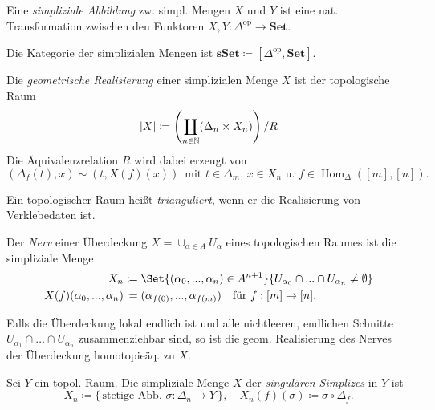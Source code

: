 \documentclass{cheat-sheet}
\newcommand{\SetC}{\mathbf{Set}} %
\newcommand{\sSet}{\mathbf{sSet}} %
\newcommand{\op}{\mathrm{op}} %
\DeclareMathOperator{\Hom}{Hom} %
\begin{document}
\begin{defn}
  Eine \emph{simpliziale Abbildung} zw. simpl. Mengen $X$ und $Y$ ist eine nat. Transformation zwischen den Funktoren $X, Y : \Delta^\op \to \SetC$.
\end{defn}

\begin{defn}
  Die Kategorie der simplizialen Mengen ist $\sSet \coloneqq [\Delta^\op, \SetC]$.
\end{defn}

\begin{defn}
  Die \emph{geometrische Realisierung} einer simplizialen Menge $X$ ist der topologische Raum
  \[ \lvert X\rvert \coloneqq \left( \coprod_{n \in \mathbb{N}} (\Delta_n \times X_{n}) \right) / R \]
  Die Äquivalenzrelation $R$ wird dabei erzeugt von
  \[
    (\Delta_f(t), x) \sim (t, X(f)(x)) \enspace
    \text{mit $t \in \Delta_m$, $x \in X_n$ u. $f \in \Hom_\Delta([m], [n])$.}
  \]
\end{defn}

\begin{defn}
  Ein topologischer Raum heißt \emph{trianguliert}, wenn er die Realisierung von Verklebedaten ist.
\end{defn}

\begin{defn}
  Der \emph{Nerv} einer Überdeckung $X = \cup_{\alpha \in A} U_\alpha$ eines topologischen Raumes ist die simpliziale Menge
  \begin{align*}
    X_n & \coloneqq \Set{(\alpha_0, \nldots, \alpha_n) \in A^{n+1}}{ U_{\alpha_0} \cap \nldots \cap U_{\alpha_n} \not= \emptyset } \\
    X(f)(\alpha_0, \nldots, \alpha_n) & \coloneqq (\alpha_{f(0)}, \nldots, \alpha_{f(m)}) \quad \text{für } f : [m] \to [n].
  \end{align*}
\end{defn}

\begin{bem}
  Falls die Überdeckung lokal endlich ist und alle nichtleeren, endlichen Schnitte $U_{\alpha_1} \cap \ldots \cap U_{\alpha_n}$ zusammenziehbar sind, so ist die geom. Realisierung des Nerves der Überdeckung homotopieäq. zu $X$.
\end{bem}

\begin{defn}
  Sei $Y$ ein topol. Raum. Die simpliziale Menge $X$ der \emph{singulären Simplizes} in $Y$ ist
  \[
    X_n \coloneqq \{ \, \text{stetige Abb. } \sigma : \Delta_n \to Y \, \}, \quad
    X_n(f)(\sigma) \coloneqq \sigma \circ \Delta_f.
  \]
\end{defn}
\end{document}
